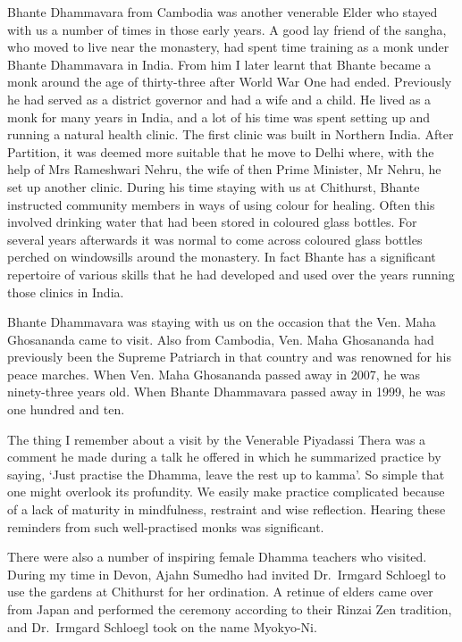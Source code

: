 Bhante Dhammavara\cite{dhammavara} from Cambodia was another venerable Elder who
stayed with us a number of times in those early years. A good lay friend
of the sangha, who moved to live near the monastery, had spent time
training as a monk under Bhante Dhammavara in India. From him I later
learnt that Bhante became a monk around the age of thirty-three after
World War One had ended. Previously he had served as a district governor
and had a wife and a child. He lived as a monk for many years in India,
and a lot of his time was spent setting up and running a natural health
clinic. The first clinic was built in Northern India. After Partition\cite{partition},
it was deemed more suitable that he move to Delhi where, with
the help of Mrs Rameshwari Nehru\cite{nehru}, the wife of then
Prime Minister, Mr Nehru, he set up another
clinic. During his time staying with us at Chithurst, Bhante instructed
community members in ways of using colour for healing. Often this
involved drinking water that had been stored in coloured glass bottles.
For several years afterwards it was normal to come across coloured glass
bottles perched on windowsills around the monastery. In fact Bhante has
a significant repertoire of various skills that he had developed and
used over the years running those clinics in India.

Bhante Dhammavara was staying with us on the occasion that the
Ven. Maha Ghosananda\cite{ghosananda} came to visit. Also from Cambodia, Ven. Maha
Ghosananda had previously been the Supreme Patriarch in that country and
was renowned for his peace marches. When Ven. Maha Ghosananda passed
away in 2007, he was ninety-three years old. When Bhante Dhammavara
passed away in 1999, he was one hundred and ten.

The thing I remember about a visit by the Venerable Piyadassi Thera was
a comment he made during a talk he offered in which he summarized
practice by saying, `Just practise the Dhamma, leave the rest up to
kamma'. So simple that one might overlook its profundity. We easily make
practice complicated because of a lack of maturity in mindfulness,
restraint and wise reflection. Hearing these reminders from such
well-practised monks was significant.

There were also a number of inspiring female Dhamma teachers who
visited. During my time in Devon, Ajahn Sumedho had invited Dr.~Irmgard
Schloegl to use the gardens at Chithurst for her ordination. A retinue
of elders came over from Japan and performed the ceremony according to
their Rinzai Zen tradition, and Dr.~Irmgard Schloegl took on the name
Myokyo-Ni.

